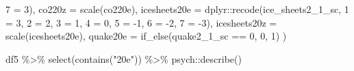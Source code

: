 \documentclass[
]{article}
\newenvironment{Shaded}{\begin{snugshade}}{\end{snugshade}}
\newcommand{\AttributeTok}[1]{\textcolor[rgb]{0.77,0.63,0.00}{#1}}
\newcommand{\DecValTok}[1]{\textcolor[rgb]{0.00,0.00,0.81}{#1}}
\newcommand{\FunctionTok}[1]{\textcolor[rgb]{0.00,0.00,0.00}{#1}}
\newcommand{\NormalTok}[1]{#1}
\newcommand{\OtherTok}[1]{\textcolor[rgb]{0.56,0.35,0.01}{#1}}
\newcommand{\SpecialCharTok}[1]{\textcolor[rgb]{0.00,0.00,0.00}{#1}}
\newcommand{\StringTok}[1]{\textcolor[rgb]{0.31,0.60,0.02}{#1}}
\begin{document}
\begin{Shaded}
\begin{Highlighting}[]
                           \StringTok{\textasciigrave{}}\AttributeTok{7}\StringTok{\textasciigrave{}} \OtherTok{=} \DecValTok{3}\NormalTok{),}
         \AttributeTok{co220z =} \FunctionTok{scale}\NormalTok{(co220e),}
         \AttributeTok{icesheets20e =}\NormalTok{ dplyr}\SpecialCharTok{::}\FunctionTok{recode}\NormalTok{(ice\_sheets2\_1\_sc, }\StringTok{\textasciigrave{}}\AttributeTok{1}\StringTok{\textasciigrave{}} \OtherTok{=} \DecValTok{3}\NormalTok{,}
                           \StringTok{\textasciigrave{}}\AttributeTok{2}\StringTok{\textasciigrave{}} \OtherTok{=} \DecValTok{2}\NormalTok{,}
                           \StringTok{\textasciigrave{}}\AttributeTok{3}\StringTok{\textasciigrave{}} \OtherTok{=} \DecValTok{1}\NormalTok{,}
                           \StringTok{\textasciigrave{}}\AttributeTok{4}\StringTok{\textasciigrave{}} \OtherTok{=} \DecValTok{0}\NormalTok{,}
                           \StringTok{\textasciigrave{}}\AttributeTok{5}\StringTok{\textasciigrave{}} \OtherTok{=} \SpecialCharTok{{-}}\DecValTok{1}\NormalTok{,}
                           \StringTok{\textasciigrave{}}\AttributeTok{6}\StringTok{\textasciigrave{}} \OtherTok{=} \SpecialCharTok{{-}}\DecValTok{2}\NormalTok{,}
                           \StringTok{\textasciigrave{}}\AttributeTok{7}\StringTok{\textasciigrave{}} \OtherTok{=} \SpecialCharTok{{-}}\DecValTok{3}\NormalTok{),}
         \AttributeTok{icesheets20z =} \FunctionTok{scale}\NormalTok{(icesheets20e),}
         \AttributeTok{quake20e =} \FunctionTok{if\_else}\NormalTok{(quake2\_1\_sc }\SpecialCharTok{==} \DecValTok{0}\NormalTok{, }\DecValTok{0}\NormalTok{, }\DecValTok{1}\NormalTok{)}
\NormalTok{         )}
\end{Highlighting}
\end{Shaded}

\begin{Shaded}
\begin{Highlighting}[]
\NormalTok{df5 }\SpecialCharTok{\%\textgreater{}\%} 
  \FunctionTok{select}\NormalTok{(}\FunctionTok{contains}\NormalTok{(}\StringTok{"20e"}\NormalTok{)) }\SpecialCharTok{\%\textgreater{}\%} 
\NormalTok{  psych}\SpecialCharTok{::}\FunctionTok{describe}\NormalTok{()}
\end{Highlighting}
\end{Shaded}
\end{document}
